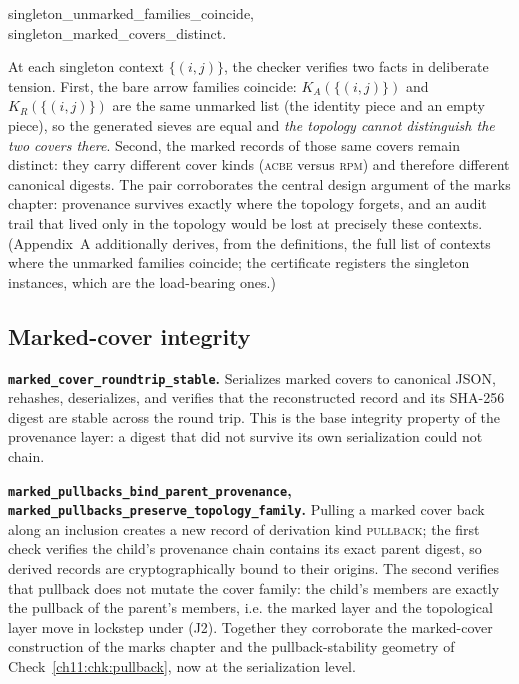 \begin{checkclass}
\label{ch11:chk:singleton}
\begin{center}
\ttfamily
singleton\_unmarked\_families\_coincide,\\
singleton\_marked\_covers\_distinct.
\end{center}
\noindent At each singleton context
$\{(i, j)\}$, the checker verifies two facts in deliberate tension. First,
the bare arrow families coincide:
$K_A(\{(i,j)\})$ and $K_R(\{(i,j)\})$ are the same unmarked list (the
identity piece and an empty piece), so the generated sieves are equal and
\emph{the topology cannot distinguish the two covers there}. Second, the
marked records of those same covers remain distinct: they carry different
cover kinds (\textsc{acbe} versus \textsc{rpm}) and therefore different
canonical digests. The pair corroborates the central design argument of the
marks chapter: provenance survives exactly where the topology forgets, and
an audit trail that lived only in the topology would be lost at precisely
these contexts. (Appendix~A additionally derives, from the definitions, the
full list of contexts where the unmarked families coincide; the certificate
registers the singleton instances, which are the load-bearing ones.)
\end{checkclass}

\subsection{Marked-cover integrity}
\label{ch11:sec:marks}

\begin{checkclass}
\label{ch11:chk:roundtrip}
\textbf{\texttt{marked\_cover\_roundtrip\_stable}.} Serializes marked covers
to canonical JSON, rehashes, deserializes, and verifies that the
reconstructed record and its SHA-256 digest are stable across the round
trip. This is the base integrity property of the provenance layer: a digest
that did not survive its own serialization could not chain.
\end{checkclass}

\begin{checkclass}
\label{ch11:chk:pullbackprov}
\textbf{\texttt{marked\_\allowbreak pullbacks\_\allowbreak bind\_\allowbreak parent\_\allowbreak provenance},
\texttt{marked\_\allowbreak pullbacks\_\allowbreak preserve\_\allowbreak topology\_\allowbreak family}.} Pulling a marked
cover back along an inclusion creates a new record of derivation kind
\textsc{pullback}; the first check verifies the child's provenance chain
contains its exact parent digest, so derived records are cryptographically
bound to their origins. The second verifies that pullback does not mutate
the cover family: the child's members are exactly the pullback of the
parent's members, i.e. the marked layer and the topological layer move in
lockstep under (J2). Together they corroborate the marked-cover construction
of the marks chapter and the pullback-stability geometry of
Check~\ref{ch11:chk:pullback}, now at the serialization level.
\end{checkclass}


